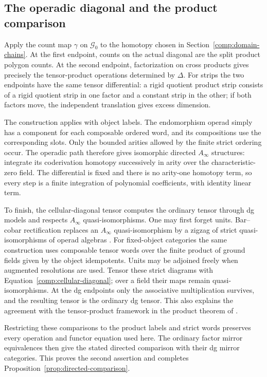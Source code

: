 \documentclass[11pt]{article}
\numberwithin{equation}{section}
\theoremstyle{definition}
\theoremstyle{remark}
\begin{document}
\subsection{The operadic diagonal and the product comparison}
\label{comp:operadic-completion}

Apply the count map $\gamma$ on $\mathcal G_0$ to the homotopy
chosen in Section~\ref{comp:domain-chains}.  At the first
endpoint, counts on the actual diagonal are the split product
polygon counts.  At the second endpoint, factorization on cross
products gives precisely the tensor-product operations determined
by $\Delta$.  For strips the two endpoints have the same tensor
differential: a rigid quotient product strip consists of a rigid
quotient strip in one factor and a constant strip in the other;
if both factors move, the independent translation gives excess
dimension.

The construction applies with object labels.  The endomorphism
operad simply has a component for each composable ordered word,
and its compositions use the corresponding slots.  Only the
bounded arities allowed by the finite strict ordering occur.  The
operadic path therefore gives isomorphic directed $A_\infty$
structures: integrate its coderivation homotopy successively in
arity over the characteristic-zero field.  The differential is
fixed and there is no arity-one homotopy term, so every step is a
finite integration of polynomial coefficients, with identity
linear term.

To finish, the cellular-diagonal tensor computes the ordinary
tensor through dg models and respects $A_\infty$
quasi-isomorphisms.  One may first forget units.  Bar--cobar
rectification replaces an $A_\infty$ quasi-isomorphism by a
zigzag of strict quasi-isomorphisms of operad algebras
\cite{LodayVallette}.  For fixed-object categories the same
construction uses composable tensor words over the finite
product of ground fields given by the object idempotents.
Units may be adjoined freely when augmented resolutions are
used.  Tensor these strict diagrams with
Equation~\eqref{comp:cellular-diagonal}; over a field their maps
remain quasi-isomorphisms.  At the dg endpoints only the
associative multiplication survives, and the resulting tensor is
the ordinary dg tensor.  This also explains the agreement with
the tensor-product framework in the product theorem of
\cite{AmorimProduct}.

Restricting these comparisons to the product labels and strict
words preserves every operation and functor equation used here.
The ordinary factor mirror equivalences then give the stated
directed comparison with their dg mirror categories.  This proves
the second assertion and completes
Proposition~\ref{prop:directed-comparison}.
\end{document}
